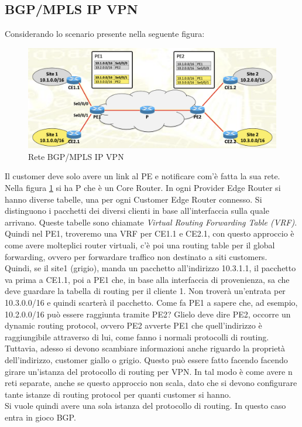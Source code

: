 \documentclass{article}
\begin{document}
\subsection{BGP/MPLS IP VPN} Considerando lo scenario presente nella seguente figura:
\begin{figure}[H]
    \centering
    \includegraphics[scale=0.5]{figures/bgp-mpls vpn.png}
    \caption{Rete BGP/MPLS IP VPN}\label{figura:bgpmpls}
\end{figure}
Il customer deve solo avere un link al PE e notificare com'è fatta la sua rete. Nella figura \ref{figura:bgpmpls} si ha P che è un Core Router. In ogni Provider Edge Router si hanno diverse tabelle, una per ogni Customer Edge Router connesso. Si distinguono i pacchetti dei diversi clienti in base all'interfaccia sulla quale arrivano. Queste tabelle sono chiamate \textit{Virtual Routing Forwarding Table (VRF)}. Quindi nel PE1, troveremo una VRF per CE1.1 e CE2.1, con questo approccio è come avere molteplici router virtuali, c'è poi una routing table per il global forwarding, ovvero per forwardare traffico non destinato a siti customers. \\ Quindi, se il site1 (grigio), manda un pacchetto all'indirizzo 10.3.1.1, il pacchetto va prima a CE1.1, poi a PE1 che, in base alla interfaccia di provenienza, sa che deve guardare la tabella di routing per il cliente 1. Non troverà un'entrata per 10.3.0.0/16 e quindi scarterà il pacchetto. Come fa PE1 a sapere che, ad esempio, 10.2.0.0/16 può essere raggiunta tramite PE2? Glielo deve dire PE2, occorre un dynamic routing protocol, ovvero PE2 avverte PE1 che quell'indirizzo è raggiungibile attraverso di lui, come fanno i normali protocolli di routing. Tuttavia, adesso si devono scambiare informazioni anche riguardo la proprietà dell'indirizzo, customer giallo o grigio. Questo può essere fatto facendo facendo girare un'istanza del protocollo di routing per VPN. In tal modo è come avere n reti separate, anche se questo approccio non scala, dato che si devono configurare tante istanze di routing protocol per quanti customer si hanno. \\ Si vuole quindi avere una sola istanza del protocollo di routing. In questo caso entra in gioco BGP. 
\end{document}

